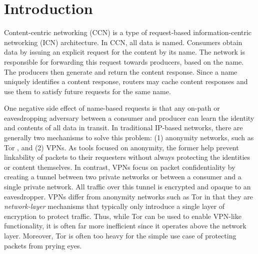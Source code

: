 \section{Introduction}

Content-centric networking (CCN) is a type of request-based information-centric
networking (ICN) architecture. In CCN, all data is named. Consumers obtain data
by issuing an explicit request for the content by its name. The network is
responsible for forwarding this request towards producers, based on the name.
The producers then generate and return the content response. Since a name uniquely identifies
a content response, routers may cache content responses and use them to satisfy
future requests for the same name.

One negative side effect of name-based requests is that any on-path or
eavesdropping adversary between a consumer and producer can learn the identity
and contents of all data in transit. In traditional IP-based networks, there are
generally two mechanisms to solve this problem: (1) anonymity
networks, such as Tor \cite{dingledine2004tor}, and (2) VPNs. As tools focused on anonymity,
the former help prevent linkability of packets to their requesters without
always protecting the identities or content themselves. In contrast, VPNs focus
on packet confidentiality by creating a tunnel between two private networks
or between a consumer and a single private network. All traffic over this tunnel is
encrypted and opaque to an eavesdropper. VPNs differ from anonymity
networks such as Tor in that they are \emph{network-layer} mechanisms that
typically only introduce a single layer of encryption to protect traffic.
Thus, while Tor can be used to enable VPN-like functionality, it is often
far more inefficient since it operates above the network layer. Moreover,
Tor is often too heavy for the simple use case of protecting packets from
prying eyes.

